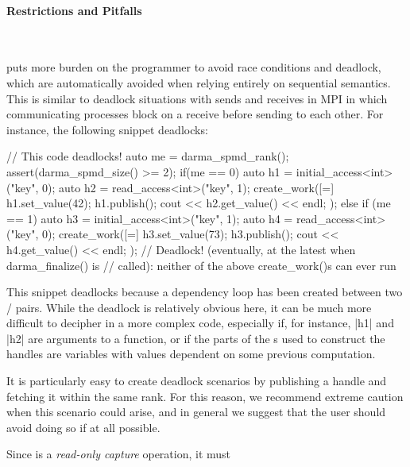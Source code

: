 \paragraph{Restrictions and Pitfalls}\mbox{}\\
\begin{compactitem}
\item {} puts more burden on the programmer to avoid race conditions and deadlock, 
  which are automatically avoided when relying entirely on \gls{sequential
  semantics}.  This is similar to deadlock situations with sends and receives in MPI in 
  which communicating processes block on a receive before sending to each other.  
  For instance, the following snippet deadlocks:
  \begin{CppCode}
// This code deadlocks!
auto me = darma_spmd_rank();
assert(darma_spmd_size() >= 2);
if(me == 0) {
  auto h1 = initial_access<int>("key", 0);
  auto h2 = read_access<int>("key", 1);
  create_work([=]{ 
    h1.set_value(42);
    h1.publish();
    cout << h2.get_value() << endl;
  }); 
}
else if (me == 1) {
  auto h3 = initial_access<int>("key", 1);
  auto h4 = read_access<int>("key", 0);
  create_work([=]{ 
    h3.set_value(73);
    h3.publish();
    cout << h4.get_value() << endl; 
  }); 
}
// Deadlock! (eventually, at the latest when darma_finalize() is
// called): neither of the above create_work()s can ever run
  \end{CppCode}
  This snippet deadlocks because a dependency loop has been created between two
  / pairs. While the deadlock is
  relatively obvious here, it can be much more difficult to decipher in a more
  complex code, especially if, for instance, |h1| and |h2| are
  arguments to a function, or if the parts of the s used to construct the
  \glspl{handle} are variables with values dependent on some previous computation.
  \item It is particularly easy to create deadlock scenarios by publishing a
    \gls{handle} and fetching it within the same \gls{rank}.  For this reason, we recommend
  extreme caution when this scenario could arise, and in general we suggest that
  the user should avoid doing so if at all possible.
\item Since  is a {\it read-only capture} operation, it must

\end{compactitem}
